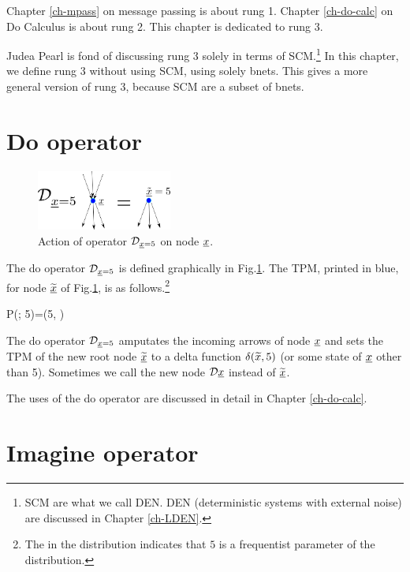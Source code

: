 Chapter \ref{ch-mpass}
on message passing
is about rung 1.
Chapter \ref{ch-do-calc}
on Do Calculus is about rung 2.
This chapter is dedicated to rung 3.

Judea Pearl
is fond of discussing rung 3 solely
in terms of SCM.\footnote{SCM are
what we call DEN. DEN (deterministic systems
with external noise) are discussed in
Chapter \ref{ch-LDEN}. }
In this chapter,
we define rung 3
without using SCM, using solely
bnets.
This gives a more general
version of rung 3,
because SCM are a subset of bnets.


\section{Do operator}


\begin{figure}[h!]
\centering
\includegraphics[width=1.75in]
{counterf/rho-op.png}
\caption{Action
of  operator $\cald_{\rvx=5}$
on node $\rvx$.}
\label{fig-rho-op}
\end{figure}

The do operator $\cald_{\rvx=5}$
is defined graphically in Fig.\ref{fig-rho-op}.
The TPM, printed in blue,
 for node $\TIL{\rvx}$ of Fig.\ref{fig-rho-op},
is as follows.\footnote{The 
in the distribution
indicates that $5$ 
is a frequentist parameter of the distribution.}

\beq\color{blue}
P(; 5)=\delta(5, )
\eeq


The do operator $\cald_{\rvx=5}$
amputates
the incoming arrows of node $\rvx$
and sets the TPM
of the new root node $\TIL{\rvx}$
to a delta function $\delta(
{\widetilde{x}}, 5)$
(or some state of $\rvx$
 other than 5).
Sometimes we call the new node
$\cald\rvx$
instead of
$\TIL{\rvx}$.

The uses of the do operator are discussed
in detail in Chapter \ref{ch-do-calc}.

\section{Imagine operator}

